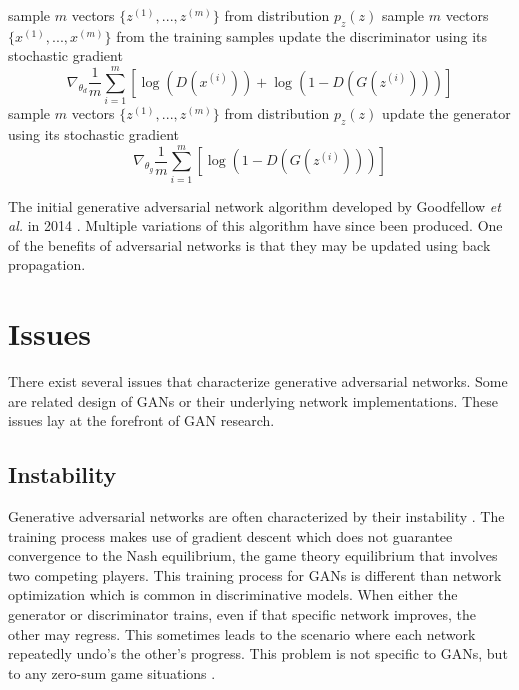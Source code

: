 \documentclass[11pt]{article}
\begin{document}
\begin{algorithm}[H]
  \SetAlgoLined
   \linebreak
   \linebreak
   {
     {
      sample $m$ vectors $\{z^{(1)},...,z^{(m)}\}$ from distribution $p_z(z)$\;
      sample $m$ vectors $\{x^{(1)},...,x^{(m)}\}$ from the training samples\;
      update the discriminator using its stochastic gradient
      $$\nabla_{\theta_d}\frac{1}{m}\sum_{i=1}^{m}[\log(D(x^{(i)}))+\log(1-D(G(z^{(i)})))]$$
    }
    sample $m$ vectors $\{z^{(1)},...,z^{(m)}\}$ from distribution $p_z(z)$\;
    update the generator using its stochastic gradient\;
    $$\nabla_{\theta_g}\frac{1}{m}\sum_{i=1}^{m}[\log(1-D(G(z^{(i)})))]$$
  }
  \caption{The initial generative adversarial network algorithm developed by Goodfellow \textit{et al.} in 2014 \citep{2014arXiv1406.2661G}. Multiple variations of this algorithm have since been produced. One of the benefits of adversarial networks is that they may be updated using back propagation.}
\end{algorithm}



\section{Issues}
There exist several issues that characterize generative adversarial networks. Some are related design of GANs or their underlying network implementations. These issues lay at the forefront of GAN research.

\subsection{Instability} \label{sec:instability}
Generative adversarial networks are often characterized by their instability \citep{2017arXiv170100160G}. The training process makes use of gradient descent which does not guarantee convergence to the Nash equilibrium, the game theory equilibrium that involves two competing players. This training process for GANs is different than network optimization which is common in discriminative models. When either the generator or discriminator trains, even if that specific network improves, the other may regress. This sometimes leads to the scenario where each network repeatedly undo's the other's progress. This problem is not specific to GANs, but to any zero-sum game situations \citep{2017arXiv170100160G}.
\end{document}
